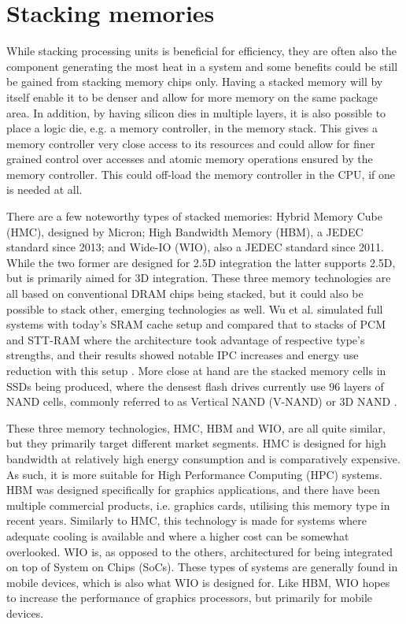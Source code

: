 \section{Stacking memories}
While stacking processing units is beneficial for efficiency, they are often also the component generating the most heat in a system and some benefits could be still be gained from stacking memory chips only. Having a stacked memory will by itself enable it to be denser and allow for more memory on the same package area. In addition, by having silicon dies in multiple layers, it is also possible to place a logic die, e.g. a memory controller, in the memory stack. This gives a memory controller very close access to its resources and could allow for finer grained control over accesses and atomic memory operations ensured by the memory controller. This could off-load the memory controller in the CPU, if one is needed at all.
\bigskip

There are a few noteworthy types of stacked memories: Hybrid Memory Cube (HMC), designed by Micron; High Bandwidth Memory (HBM), a JEDEC standard since 2013; and Wide-IO (WIO), also a JEDEC standard since 2011. While the two former are designed for 2.5D integration the latter supports 2.5D, but is primarily aimed for 3D integration. These three memory technologies are all based on conventional DRAM chips being stacked, but it could also be possible to stack other, emerging technologies as well. Wu et al. simulated full systems with today's SRAM cache setup and compared that to stacks of PCM and STT-RAM where the architecture took advantage of respective type's strengths, and their results showed notable IPC increases and energy use reduction with this setup \cite{Wu:2009:HCA:1555754.1555761}. More close at hand are the stacked memory cells in SSDs being produced, where the densest flash drives currently use 96 layers of NAND cells, commonly referred to as Vertical NAND (V-NAND) or 3D NAND \cite{tallis_2017}.
\bigskip

These three memory technologies, HMC, HBM and WIO, are all quite similar, but they primarily target different market segments. HMC is designed for high bandwidth at relatively high energy consumption and is comparatively expensive. As such, it is more suitable for High Performance Computing (HPC) systems. HBM was designed specifically for graphics applications, and there have been multiple commercial products, i.e. graphics cards, utilising this memory type in recent years. Similarly to HMC, this technology is made for systems where adequate cooling is available and where a higher cost can be somewhat overlooked. WIO is, as opposed to the others, architectured for being integrated on top of System on Chips (SoCs). These types of systems are generally found in mobile devices, which is also what WIO is designed for. Like HBM, WIO hopes to increase the performance of graphics processors, but primarily for mobile devices.
\bigskip

